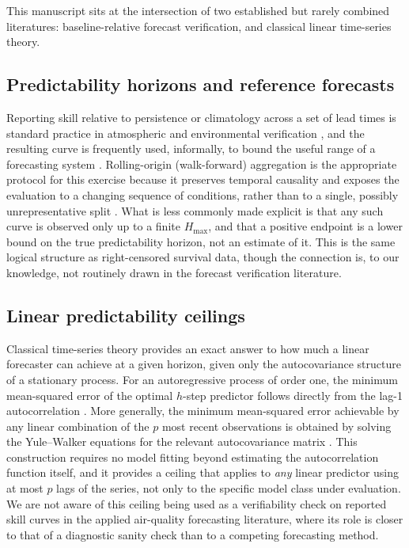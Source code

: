 \documentclass{article}
\begin{document}
This manuscript sits at the intersection of two established but rarely
combined literatures: baseline-relative forecast verification, and classical
linear time-series theory.

\subsection{Predictability horizons and reference forecasts}

Reporting skill relative to persistence or climatology across a set of lead
times is standard practice in atmospheric and environmental verification
\citep{murphy1992,donnelly2015}, and the resulting curve is frequently used,
informally, to bound the useful range of a forecasting system
\citep{gneiting2011}.
Rolling-origin (walk-forward) aggregation is the appropriate protocol for this
exercise because it preserves temporal causality and exposes the evaluation to
a changing sequence of conditions, rather than to a single, possibly
unrepresentative split \citep{tashman2000}.
What is less commonly made explicit is that any such curve is observed only up
to a finite $H_{\max}$, and that a positive endpoint is a lower bound on the
true predictability horizon, not an estimate of it.
This is the same logical structure as right-censored survival data, though the
connection is, to our knowledge, not routinely drawn in the forecast
verification literature.

\subsection{Linear predictability ceilings}

Classical time-series theory provides an exact answer to how much a linear
forecaster can achieve at a given horizon, given only the autocovariance
structure of a stationary process.
For an autoregressive process of order one, the minimum mean-squared error of
the optimal $h$-step predictor follows directly from the lag-1 autocorrelation
\citep{boxjenkins2015}.
More generally, the minimum mean-squared error achievable by any linear
combination of the $p$ most recent observations is obtained by solving the
Yule--Walker equations for the relevant autocovariance matrix
\citep{boxjenkins2015}.
This construction requires no model fitting beyond estimating the
autocorrelation function itself, and it provides a ceiling that applies to
\emph{any} linear predictor using at most $p$ lags of the series, not only to
the specific model class under evaluation.
We are not aware of this ceiling being used as a verifiability check on
reported skill curves in the applied air-quality forecasting literature,
where its role is closer to that of a diagnostic sanity check than to a
competing forecasting method.
\end{document}
